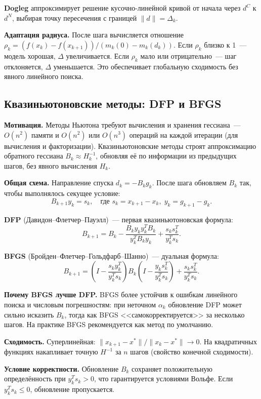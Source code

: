 \documentclass[12pt]{article}
\begin{document}
\textbf{Dogleg} аппроксимирует решение кусочно-линейной кривой от начала через $d^C$ к $d^N$, выбирая точку пересечения с границей $\|d\| = \Delta_k$.

\textbf{Адаптация радиуса.} После шага вычисляется отношение $\rho_k = (f(x_k) - f(x_{k+1})) / (m_k(0) - m_k(d_k))$. Если $\rho_k$ близко к 1~--- модель хорошая, $\Delta$ увеличивается. Если $\rho_k$ мало или отрицательно~--- шаг отклоняется, $\Delta$ уменьшается. Это обеспечивает глобальную сходимость без явного линейного поиска.

\subsection{Квазиньютоновские методы: DFP и BFGS}

\textbf{Мотивация.} Методы Ньютона требуют вычисления и хранения гессиана~--- $O(n^2)$ памяти и $O(n^2)$ или $O(n^3)$ операций на каждой итерации (для вычисления и факторизации). Квазиньютоновские методы строят аппроксимацию обратного гессиана $B_k \approx H_k^{-1}$, обновляя её по информации из предыдущих шагов, без явного вычисления $H_k$.

\textbf{Общая схема.} Направление спуска $d_k = -B_k g_k$. После шага обновляем $B_k$ так, чтобы выполнялось секущее условие:
\[
    B_{k+1} y_k = s_k, \quad \text{где } s_k = x_{k+1} - x_k, \; y_k = g_{k+1} - g_k.
\]

\textbf{DFP} (Давидон--Флетчер--Пауэлл)~--- первая квазиньютоновская формула:
\[
    B_{k+1} = B_k - \frac{B_k y_k y_k^T B_k}{y_k^T B_k y_k} + \frac{s_k s_k^T}{y_k^T s_k}.
\]

\textbf{BFGS} (Бройден--Флетчер--Гольдфарб--Шанно)~--- дуальная формула:
\[
    B_{k+1} = \left(I - \frac{s_k y_k^T}{y_k^T s_k}\right) B_k \left(I - \frac{y_k s_k^T}{y_k^T s_k}\right) + \frac{s_k s_k^T}{y_k^T s_k}.
\]

\textbf{Почему BFGS лучше DFP.} BFGS более устойчив к ошибкам линейного поиска и числовым погрешностям: при неточном $\alpha_k$ обновление DFP может сильно исказить $B_k$, тогда как BFGS <<самокорректируется>> за несколько шагов. На практике BFGS рекомендуется как метод по умолчанию.

\textbf{Сходимость.} Суперлинейная: $\|x_{k+1} - x^*\| / \|x_k - x^*\| \to 0$. На квадратичных функциях накапливает точную $H^{-1}$ за $n$ шагов (свойство конечной сходимости).

\textbf{Условие корректности.} Обновление $B_k$ сохраняет положительную определённость при $y_k^T s_k > 0$, что гарантируется условиями Вольфе. Если $y_k^T s_k \leq 0$, обновление пропускается.
\end{document}
